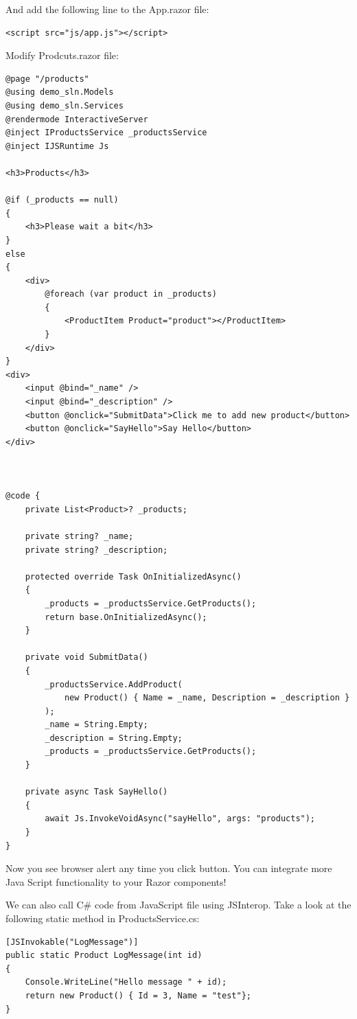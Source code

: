 And add the following line to the App.razor file:

\begin{lstlisting}
<script src="js/app.js"></script>
\end{lstlisting}

Modify Prodcuts.razor file:

\begin{lstlisting}
@page "/products"
@using demo_sln.Models
@using demo_sln.Services
@rendermode InteractiveServer
@inject IProductsService _productsService
@inject IJSRuntime Js

<h3>Products</h3>

@if (_products == null)
{
    <h3>Please wait a bit</h3>
}
else
{
    <div>
        @foreach (var product in _products)
        {
            <ProductItem Product="product"></ProductItem>
        }
    </div>
}
<div>
    <input @bind="_name" />
    <input @bind="_description" />
    <button @onclick="SubmitData">Click me to add new product</button>
    <button @onclick="SayHello">Say Hello</button>
</div>



@code {
    private List<Product>? _products;

    private string? _name;
    private string? _description;

    protected override Task OnInitializedAsync()
    {
        _products = _productsService.GetProducts();
        return base.OnInitializedAsync();
    }

    private void SubmitData()
    {
        _productsService.AddProduct(
            new Product() { Name = _name, Description = _description }
        );
        _name = String.Empty;
        _description = String.Empty;
        _products = _productsService.GetProducts();
    }

    private async Task SayHello()
    {
        await Js.InvokeVoidAsync("sayHello", args: "products");
    }
}

\end{lstlisting}

Now you see browser alert any time you click button. You can integrate more Java Script functionality to your Razor components!

We can also call C\# code from JavaScript file using JSInterop. Take a look at the following static method in ProductsService.cs:

\begin{lstlisting}
[JSInvokable("LogMessage")]
public static Product LogMessage(int id)
{
    Console.WriteLine("Hello message " + id);
    return new Product() { Id = 3, Name = "test"};
}
\end{lstlisting}

